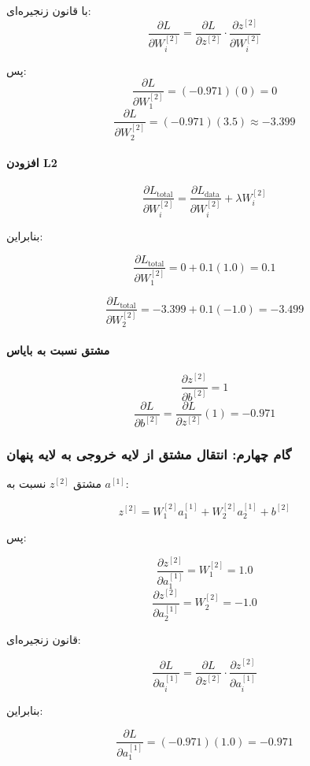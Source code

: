 \documentclass{article}
\begin{document}
با قانون زنجیره‌ای:
\[
\frac{\partial L}{\partial W^{[2]}_i}
=
\frac{\partial L}{\partial z^{[2]}}
\cdot
\frac{\partial z^{[2]}}{\partial W^{[2]}_i}
\]

پس:
\[
\frac{\partial L}{\partial W^{[2]}_1}
=
(-0.971)(0)=0
\]
\[
\frac{\partial L}{\partial W^{[2]}_2}
=
(-0.971)(3.5)\approx -3.399
\]

\paragraph*{افزودن L2}

\[
\frac{\partial L_{\text{total}}}{\partial W^{[2]}_i}
=
\frac{\partial L_{\text{data}}}{\partial W^{[2]}_i}
+
\lambda W^{[2]}_i
\]

بنابراین:

\[
\frac{\partial L_{\text{total}}}{\partial W^{[2]}_1}
=
0 + 0.1(1.0) = 0.1
\]

\[
\frac{\partial L_{\text{total}}}{\partial W^{[2]}_2}
=
-3.399 + 0.1(-1.0)
=
-3.499
\]

\paragraph*{مشتق نسبت به بایاس}

\[
\frac{\partial z^{[2]}}{\partial b^{[2]}} = 1
\]
\[
\frac{\partial L}{\partial b^{[2]}}
=
\frac{\partial L}{\partial z^{[2]}}
(1)
=
-0.971
\]

\subsubsection*{گام چهارم: انتقال مشتق از لایه خروجی به لایه پنهان}

مشتق \(z^{[2]}\) نسبت به \(a^{[1]}\):

\[
z^{[2]} = W^{[2]}_1 a^{[1]}_1 + W^{[2]}_2 a^{[1]}_2 + b^{[2]}
\]

پس:

\[
\frac{\partial z^{[2]}}{\partial a^{[1]}_1} = W^{[2]}_1 = 1.0
\]
\[
\frac{\partial z^{[2]}}{\partial a^{[1]}_2} = W^{[2]}_2 = -1.0
\]

قانون زنجیره‌ای:

\[
\frac{\partial L}{\partial a^{[1]}_i}
=
\frac{\partial L}{\partial z^{[2]}}
\cdot
\frac{\partial z^{[2]}}{\partial a^{[1]}_i}
\]

بنابراین:

\[
\frac{\partial L}{\partial a^{[1]}_1}
=
(-0.971)(1.0)
=
-0.971
\]
\end{document}
